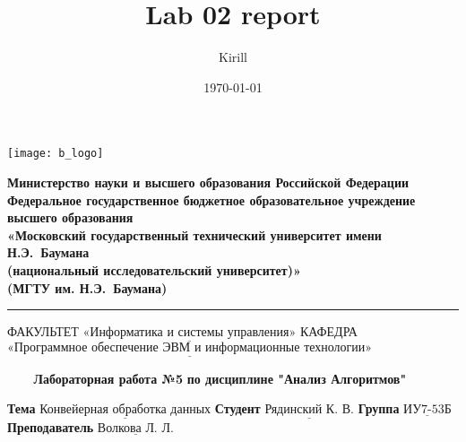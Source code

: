 

\title{Lab 02 report}
\author{Kirill}

\date{\today}


\thispagestyle{empty}

\noindent \begin{minipage}{0.15\textwidth}
    \texttt{[image: b\_logo]}
\end{minipage}
\noindent\begin{minipage}{0.85\textwidth}\centering
    \textbf{Министерство науки и высшего образования Российской Федерации}\\
    \textbf{Федеральное государственное бюджетное образовательное учреждение высшего образования}\\
    \textbf{«Московский государственный технический университет имени Н.Э.~Баумана}\\
    \textbf{(национальный исследовательский университет)»}\\
    \textbf{(МГТУ им. Н.Э.~Баумана)}
\end{minipage}

\noindent\rule{16cm}{3pt}
\newline\newline
\noindent ФАКУЛЬТЕТ $\underline{\text{«Информатика и системы управления»}}$ \newline\newline
\noindent КАФЕДРА $\underline{\text{«Программное обеспечение ЭВМ и информационные технологии»}}$\newline


\begin{center}
    \noindent\begin{minipage}{1.3\textwidth}\centering
    \Large\textbf{   ~~~ Лабораторная работа №5}\newline
    \textbf{по дисциплине "Анализ Алгоритмов"}\newline\newline\newline
    \end{minipage}
\end{center}

\noindent\textbf{Тема} $\underline{\text{Конвейерная обработка данных}}$\newline\newline
\noindent\textbf{Студент} $\underline{\text{Рядинский К. В.}}$\newline\newline
\noindent\textbf{Группа} $\underline{\text{ИУ7-53Б}}$\newline\newline
\noindent\textbf{Преподаватель} $\underline{\text{Волкова Л. Л.}}$\newline

